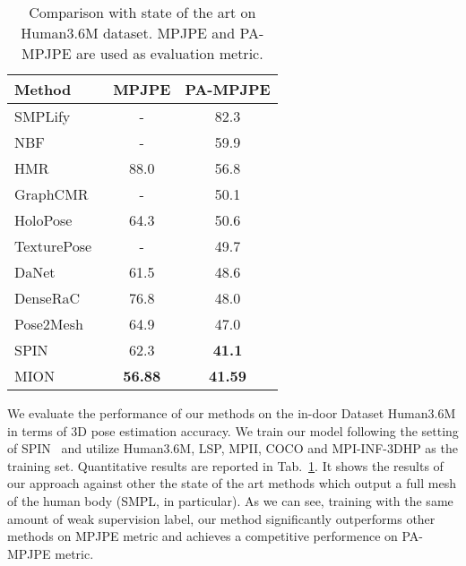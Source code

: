 \documentclass[sigconf]{acmart}
\begin{document}
\begin{table}[t]
	\centering
	
	\begin{tabular}{lcc}
		\toprule
		Method   & MPJPE & PA-MPJPE \\
		\midrule
		SMPLify~\cite{bogo2016keep}   & - &  82.3  \\
		NBF~\cite{omran2018neural}   & - & 59.9 \\
		HMR~\cite{kanazawa2018end}   & 88.0 & 56.8  \\
		GraphCMR~\cite{kolotouros2019convolutional}   & - & 50.1  \\
		HoloPose~\cite{guler2019holopose}    & 64.3 & 50.6  \\
		TexturePose~\cite{pavlakos2019texturepose}   & - & 49.7  \\
		DaNet~\cite{zhang2019danet}          & 61.5 & 48.6  \\
		DenseRaC~\cite{xu2019denserac}          & 76.8 & 48.0  \\
		Pose2Mesh~\cite{choi2020pose2mesh}   & 64.9 & 47.0  \\
		SPIN~\cite{kolotouros2019learning}   & 62.3 & \textbf{41.1}  \\
\midrule
		MION & \textbf{56.88} & \textbf{41.59} \\
		\bottomrule
	\end{tabular}
	\vspace{1em}
	\caption{Comparison with state of the art on Human3.6M dataset. MPJPE and PA-MPJPE are used as evaluation metric.}
	\label{table_compare-h36m}
\end{table}

We evaluate the performance of our methods on the in-door Dataset Human3.6M in terms of 3D pose estimation accuracy. 
We train our model following the setting of SPIN~\cite{kolotouros2019learning} and utilize 
Human3.6M, LSP, MPII, COCO and MPI-INF-3DHP as the training set. 
Quantitative results are reported in Tab.~\ref{table_compare-h36m}. It shows the results of our approach 
against other the state of the art methods which output a full mesh of the human body (SMPL, in particular). 
As we can see, training with the same amount of weak supervision label, our method significantly 
outperforms other methods on MPJPE metric and achieves a competitive performence on PA-MPJPE metric. 
\end{document}
